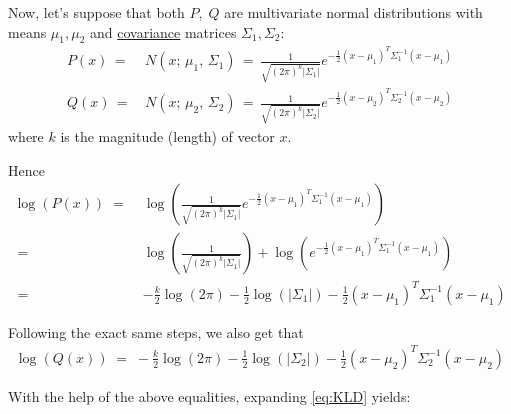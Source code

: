 \documentclass[12pt]{report}
\begin{document}
Now, let's suppose that both $P,\; Q$ are multivariate
normal distributions with means $\mu_1, \mu_2$ and
\href{https://en.wikipedia.org/wiki/Covariance_matrix}{covariance} matrices
$\Sigma_1, \Sigma_2$:
\begin{align*}
P(x) \,=&\, N(x;\, \mu_1,\, \Sigma_1) \,=\,
    \frac{1}{\sqrt{(2\pi)^k|\Sigma_1|}}
    e^{-\frac{1}{2}(x-\mu_1)^T\Sigma_1^{-1}(x - \mu_1)} \\
Q(x) \,=&\, N(x;\, \mu_2,\, \Sigma_2) \,=\,
    \frac{1}{\sqrt{(2\pi)^k|\Sigma_2|}}
    e^{-\frac{1}{2}(x-\mu_2)^T\Sigma_2^{-1}(x - \mu_2)}
\end{align*}
where $k$ is the magnitude (length) of vector $x$.
\smallskip

\noindent Hence
\begin{align*}
    \log(P(x)) \;=\;& \log\left(\frac{1}{\sqrt{(2\pi)^k|\Sigma_1|}}
                e^{-\frac{1}{2}(x-\mu_1)^T\Sigma_1^{-1}(x - \mu_1)} \right) \\
               \;=\;& \log \left( \frac{1}{\sqrt{(2\pi)^k|\Sigma_1|}} \right) +
                \log \left( e^{-\frac{1}{2}(x-\mu_1)^T\Sigma_1^{-1}
                (x - \mu_1)} \right) \\
               \;=\;& -\frac{k}{2}\log(2\pi) -\frac{1}{2}\log(|\Sigma_1|) -
                \frac{1}{2}(x-\mu_1)^T\Sigma_1^{-1} (x - \mu_1)
\end{align*}
\clearpage

\noindent Following the exact same steps, we also get that
\begin{align*}
    \log(Q(x)) \;=\; -\frac{k}{2}\log(2\pi) -\frac{1}{2}\log(|\Sigma_2|) -
    \frac{1}{2}(x-\mu_2)^T\Sigma_2^{-1} (x - \mu_2)
\end{align*}

\noindent With the help of the above equalities, expanding \eqref{eq:KLD} yields:
\end{document}
